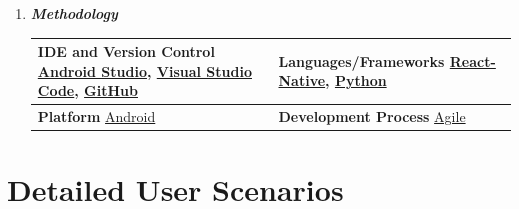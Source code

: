 \documentclass{article}
\begin{document}
\begin{enumerate}

\item \textbf{\textit{Methodology}}
\begin{center}
    \begin{tabular}{ |p{75mm}|p{75mm}| }
        \hline
        \textbf{IDE and Version Control}  \newline
        {\href{https://developer.android.com/studio}{Android Studio}},
        {\href{https://code.visualstudio.com/}{Visual Studio Code}},
        {\href{https://github.com/}{GitHub}}   & 
        \textbf{Languages/Frameworks} \newline 
        {\href{https://facebook.github.io/react-native/}{React-Native}},
        {\href{https://www.python.org/}{Python}} \\
        \hline
        \textbf{Platform} \newline
        {\href{https://www.android.com/}{Android}} & 
        \textbf{Development Process} \newline
        {\href{https://agilemanifesto.org/}{Agile}} \\
        \hline
    \end{tabular}
\end{center}
\end{enumerate}



\section*{Detailed User Scenarios }
\end{document}
